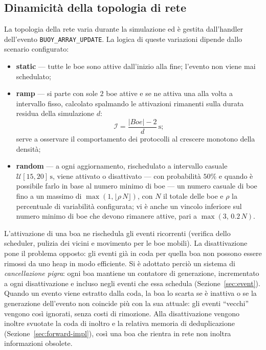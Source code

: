 \subsection{Dinamicit\`a della topologia di rete}
\label{sec:dynamics}
La topologia della rete varia durante la simulazione ed \`e gestita dall'handler dell'evento \texttt{BUOY\_ARRAY\_UPDATE}. 
La logica di queste variazioni dipende dallo scenario configurato:  
\begin{itemize}[leftmargin=1.4em,nosep]
  \item \textbf{static} --- tutte le boe sono attive dall'inizio alla fine; l'evento non
  viene mai schedulato;
  \item \textbf{ramp} --- si parte con sole $2$ boe attive e se ne attiva una alla volta a
  intervallo fisso, calcolato spalmando le attivazioni rimanenti sulla durata residua della simulazione $d$: 
  \begin{equation}
      \mathcal{I} = \frac{|Boe| - 2}{d}\,\si{\second};
  \label{eq:ramp}
  \end{equation}
  serve a osservare il comportamento dei protocolli al crescere
  monotono della densit\`a;
  \item \textbf{random} --- a ogni aggiornamento, rischedulato a intervallo casuale
  $\mathcal{U}[15, 20]\,\si{\second}$, viene attivato o disattivato --- con probabilit\`a
  $50\%$ e quando \`e possibile farlo in base al numero minimo di boe ---
  un numero casuale di boe fino a un massimo di $\max(1, \lfloor \rho\,N \rfloor)$,
  con $N$ il totale delle boe e $\rho$ la percentuale di variabilit\`a configurata; 
  vi \`e anche un vincolo inferiore sul numero minimo di boe che devono rimanere attive, pari a $\max(3,\, 0.2\,N)$.
\end{itemize}

L'attivazione di una boa ne rischedula gli eventi ricorrenti (verifica dello scheduler,
pulizia dei vicini e movimento per le boe mobili). La disattivazione pone il problema
opposto: gli eventi gi\`a in coda per quella boa non possono essere rimossi da uno heap in
modo efficiente. Si \`e adottato perci\`o un sistema di \emph{cancellazione pigra}: ogni boa mantiene un
contatore di generazione, incrementato a ogni disattivazione e incluso
negli eventi che essa schedula (Sezione~\ref{sec:event}). Quando un evento viene
estratto dalla coda, la boa lo scarta se \`e inattiva o se la generazione dell'evento non
coincide pi\`u con la sua attuale: gli eventi ``vecchi'' vengono cos\`i ignorati, senza costi
di rimozione. Alla disattivazione vengono inoltre svuotate la coda di inoltro
e la relativa memoria di deduplicazione (Sezione~\ref{sec:forward-impl}), cos\`i una boa che
rientra in rete non inoltra informazioni obsolete.

